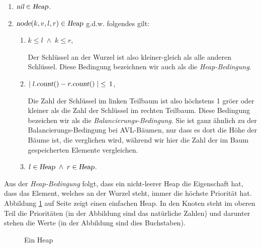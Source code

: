 \begin{enumerate}
\item $\textsl{nil} \in \textsl{Heap}$.
\item $\textsl{node}(k,v,l,r) \in \textsl{Heap}$ g.d.w. folgendes gilt:
      \begin{enumerate}
      \item $k \leq l \;\wedge\; k \leq r$,

            Der Schl\"ussel an der Wurzel ist also kleiner-gleich als alle anderen Schl\"ussel.
            Diese Bedingung bezeichnen wir auch als die \emph{Heap-Bedingung}.
      \item $\mid l.\textsl{count}() - r.\textsl{count}() \mid \;\leq\, 1$,

            Die Zahl der Schl\"ussel im linken Teilbaum ist also h\"ochstens 1 gr\"o\3er oder
            kleiner als die Zahl der Schl\"ussel im rechten Teilbaum.
            Diese Bedingung bezeichen wir als die \emph{Balancierungs-Bedingung}.  Sie ist
            ganz \"ahnlich zu der Balancierungs-Bedingung bei AVL-B\"aumen, nur dass es dort
            die H\"ohe der B\"aume ist, die verglichen wird, w\"ahrend wir hier die Zahl der
            im Baum gespeicherten Elemente vergleichen.
      \item $l \in \textsl{Heap} \;\wedge\; r \in \textsl{Heap}$.
      \end{enumerate}
\end{enumerate}
Aus der \emph{Heap-Bedingung} folgt, dass ein nicht-leerer Heap die Eigenschaft hat, dass
das Element, welches an der Wurzel steht, immer die h\"ochste Priorit\"at hat.  Abbildung
\ref{fig:heap-list} auf Seite \pageref{fig:heap-list} zeigt einen einfachen Heap.
In den Knoten steht im oberen Teil die Priorit\"aten (in der Abbildung sind das nat\"urliche Zahlen) und
darunter stehen die Werte (in der Abbildung sind dies Buchstaben).

\begin{figure}[!t]
  \centering
  \caption{Ein Heap}
  \label{fig:heap-list}
\end{figure}


